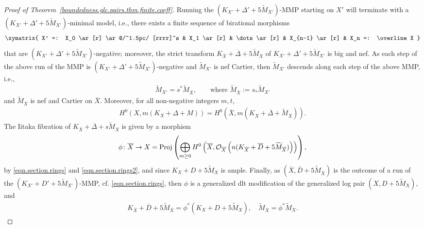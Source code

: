 \documentclass[12pt, a4paper]{amsart}
\newcounter{Theorem}
\theoremstyle{definition}
\theoremstyle{named}
\begin{document}
\begin{proof}[Proof of Theorem~\ref{boundedness.glc.pairs.thm.finite.coeff}]
Running the 
$(K_{X'}+\Delta'+5\widetilde{M}_{X'})$-MMP
starting on 
$X'$ will terminate with a $(K_{X'}+\Delta'+5\widetilde{M}_{X'})$-minimal model, 
i.e., there exists a finite sequence of birational morphisms
\begin{align*}
 \xymatrix{
X' =: X_0 \ar[r]
\ar @/^1.5pc/ [rrrr]^s
&
X_1 \ar[r]
&
\dots \ar[r]
&
X_{n-1} \ar[r]
&
X_n =: \overline X
}   
\end{align*}
that are 
$(K_{X'}+\Delta'+5\widetilde{M}_{X'})$-negative;
moreover, the strict transform 
$K_{\overline X}+ \overline \Delta+ 5\widetilde{M}_{\overline X}$
of 
$K_{X'}+\Delta'+ 5\widetilde{M}_{X'}$
is big and nef.
As each step of the above run of the MMP
is 
$(K_{X'}+\Delta'+ 5\widetilde{M}_{X'})$-negative 
and
$\widetilde{M}_{X'}$
is nef Cartier, then
$\widetilde{M}_{X'}$ descends along each step of the above MMP, i.e., 
\begin{align}
\label{eqn:descent.M}
\widetilde{M}_{X'} = s^\ast \widetilde{M}_{\overline X}, 
\qquad 
\text{where }
\widetilde{M}_{\overline X} := s_\ast \widetilde{M}_{X'}
\end{align}
and 
$\widetilde{M}_{\overline X}$
is nef and Cartier on 
$\overline{X}$.
Moreover, for all non-negative integers 
$m, t$,
\begin{align}
\label{eqn.section.rings2}
H^0(X, 
m(K_X+\Delta+M))=
H^0(\overline X, 
m(K_{\overline X}+ \overline \Delta +\widetilde{M}_{\overline X})).
\end{align}
The Iitaka fibration of 
$K_{\overline X}+ \overline \Delta +s\widetilde{M}_{\overline X}$
is given by a morphism
\begin{align*}
\phi \colon \overline X \to X=
{\rm Proj} 
\left (
\bigoplus_{m \geq 0} 
H^0 \left (
\overline X, 
\mathcal O_{\overline X}
\left (
n(K_{\overline X}+ \overline D+ 5\widetilde{M}_{\overline X})
\right )
\right)
\right ),
\end{align*} 
by 
\eqref{eqn.section.rings} and 
\eqref{eqn.section.rings2}, and 
since $K_{X}+ D+5 \widetilde{M}_X$ is ample.
Finally, as 
$(\overline X,  \overline D+ 5\widetilde{M}_{\overline X})$
is the outcome of a run of the 
$(K_{X'}+D'+5\widetilde{M}_{X'})$-MMP, 
cf. \eqref{eqn.section.rings}, 
then 
$\phi$
is a generalized dlt modification of the generalized log pair 
$(X, D+ 5\widetilde{M}_X)$, and 
\begin{align}
\label{eqn.dlt.mod.pullback.formula}
K_{\overline X}+ \overline D+ 5\widetilde{M}_{\overline X}
=
\phi^\ast
(K_X+D+5\widetilde{M}_X), 
\quad 
\widetilde{M}_{\overline X}=\phi^\ast \widetilde{M}_X.
\end{align}

\end{proof}
\end{document}
